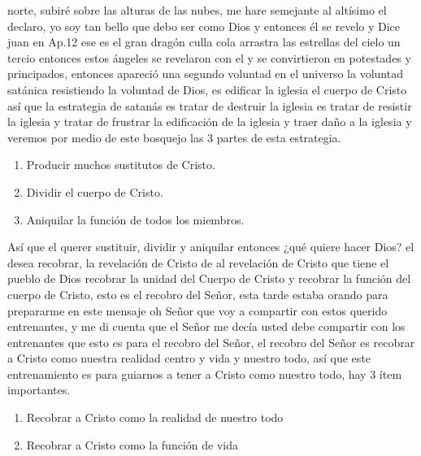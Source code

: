 \documentclass[12pt]{article}
\begin{document}
norte, subiré sobre las alturas de las nubes, me hare semejante al altísimo el declaro, yo soy tan bello que debo ser como Dios y entonces él se revelo y Dice juan en Ap.12 ese es el gran dragón culla cola arrastra las estrellas del cielo un tercio entonces estos ángeles se revelaron con el y se convirtieron en potestades y principados, entonces apareció una segundo voluntad en el universo la voluntad satánica resistiendo la voluntad de Dios, es edificar la iglesia el cuerpo de Cristo así que la estrategia de satanás es tratar de destruir la iglesia es tratar de resistir la iglesia y tratar de frustrar la edificación de la iglesia y traer daño a la iglesia y veremos por medio de este bosquejo las 3 partes de esta estrategia.

\begin{enumerate}
\item Producir muchos sustitutos de Cristo.

\item Dividir el cuerpo de Cristo.

\item Aniquilar la función de todos los miembros. 

\end{enumerate}

Así que el querer sustituir, dividir y aniquilar entonces ¿qué quiere hacer Dios? el desea recobrar, la revelación de Cristo de al revelación de Cristo que tiene el pueblo de Dios recobrar la unidad del Cuerpo de Cristo y recobrar la función del cuerpo de Cristo, esto es el recobro del Señor, esta tarde estaba orando para prepararme en este mensaje oh Señor que voy a compartir con estos querido entrenantes, y me di cuenta que el Señor me decía usted debe compartir con los entrenantes que esto es para el recobro del Señor, el recobro del Señor es recobrar a Cristo como nuestra realidad centro y vida y nuestro todo, así que este entrenamiento es para guiarnos a tener a Cristo como nuestro todo, hay 3 ítem importantes.\\

\begin{enumerate}
\item Recobrar a Cristo como la realidad de nuestro todo

\item Recobrar a Cristo como la función de vida

\end{enumerate}
\end{document}
